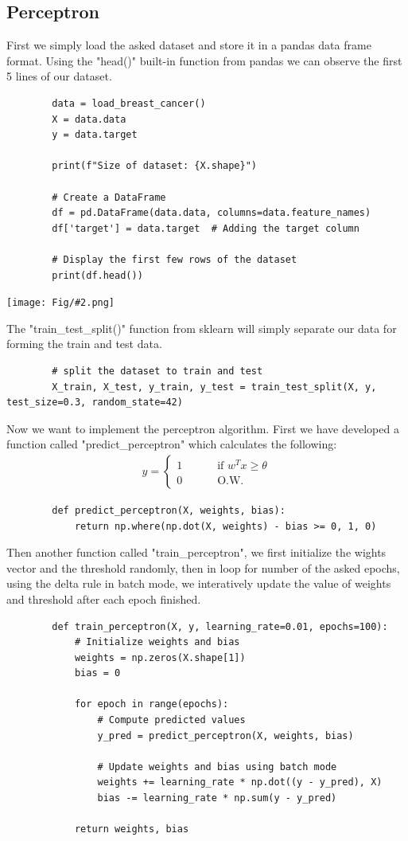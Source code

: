 \documentclass[]{article}
\newcommand{\pict}[2]{\begin{center}
		\texttt{[image: Fig/\#2.png]}
\end{center}}
\begin{document}
	\subsection{Perceptron}
	First we simply load the asked dataset and store it in a pandas data frame format. Using the "head()" built-in function from pandas we can observe the first 5 lines of our dataset.
	\begin{lstlisting}
		data = load_breast_cancer()
		X = data.data  
		y = data.target
		
		print(f"Size of dataset: {X.shape}")
		
		# Create a DataFrame
		df = pd.DataFrame(data.data, columns=data.feature_names)
		df['target'] = data.target  # Adding the target column
		
		# Display the first few rows of the dataset
		print(df.head())
	\end{lstlisting}
	\pict{0.5}{F1}
	The "train\_test\_split()" function from sklearn will simply separate our data for forming the train and test data.
	\begin{lstlisting}
		# split the dataset to train and test
		X_train, X_test, y_train, y_test = train_test_split(X, y, test_size=0.3, random_state=42)
	\end{lstlisting}
	Now we want to implement the perceptron algorithm. First we have developed a function called "predict\_perceptron" which calculates the following:
	\begin{align*}
		y = \begin{cases}
			1 \qquad &\text{ if } w^Tx \ge \theta \\
			0 & \text{ O.W.}
		\end{cases}
	\end{align*}
	\begin{lstlisting}
		def predict_perceptron(X, weights, bias):
			return np.where(np.dot(X, weights) - bias >= 0, 1, 0)
	\end{lstlisting}
	Then another function called "train\_perceptron", we first initialize the wights vector and the threshold randomly, then in loop for number of the asked epochs, using the delta rule in batch mode, we interatively update the value of weights and threshold after each epoch finished.
	\begin{lstlisting}
		def train_perceptron(X, y, learning_rate=0.01, epochs=100):
			# Initialize weights and bias
			weights = np.zeros(X.shape[1])
			bias = 0
			
			for epoch in range(epochs):
				# Compute predicted values
				y_pred = predict_perceptron(X, weights, bias)
				
				# Update weights and bias using batch mode
				weights += learning_rate * np.dot((y - y_pred), X)
				bias -= learning_rate * np.sum(y - y_pred)
			
			return weights, bias
	\end{lstlisting}
\end{document}
